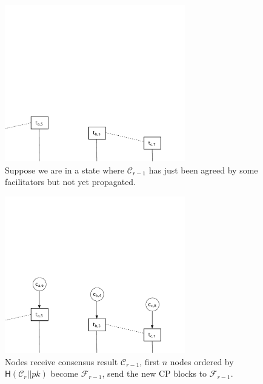 \documentclass{beamer}
\newcommand{\C}{\mathcal{C}}
\newcommand{\F}{\mathcal{F}}
\begin{document}
\begin{frame}{\subsecname}
  \begin{figure}[h]
  \includegraphics[width=0.7\textwidth]{trustchain-1}
  \centering
  \caption{Suppose we are in a state where $\C_{r - 1}$ has just been agreed by some facilitators but not yet propagated.}
  \end{figure}
\end{frame}

\begin{frame}{\subsecname}
  \begin{figure}[h]
  \includegraphics[width=0.7\textwidth]{trustchain-2}
  \centering
  \caption{Nodes receive consensus result $\C_{r - 1}$,
    first $n$ nodes ordered by $\textsf{H}(\C_r || pk)$ become $\F_{r-1}$,
    send the new CP blocks to $\F_{r-1}$.}
  \end{figure}
\end{frame}
\end{document}
